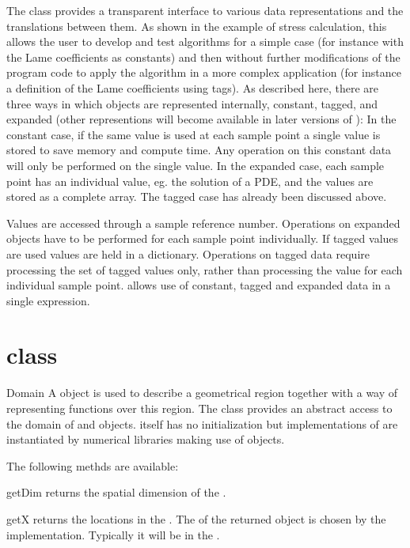 The \Data class provides a transparent interface to various data representations and the 
translations between them. As shown in the example of stress calculation, this allows the user to
develop and test algorithms for a simple case (for instance with the Lame coefficients as constants)
and then without further modifications of the program code to apply the algorithm in a
more complex application (for instance a definition of the Lame coefficients using tags). 
As described here, there are three ways in which \Data objects are represented internally, constant, tagged, and expanded (other representions will become available in later versions of \escript):
In the constant case, if the same value is used at each sample point a single value is stored to save memory and compute time. 
Any operation on this constant data will only be performed on the single value. 
In the expanded case, each sample point has an individual value, eg. the solution of a PDE,
and the values are stored as a complete array. The tagged case has already been discussed above.
 
Values are accessed through a sample reference number. Operations on expanded \Data
objects have to be performed for each sample point individually. If tagged values are used values are
held in a dictionary. Operations on tagged data require processing the set of tagged values only, rather than 
processing the value for each individual sample point. 
\escript allows use of constant, tagged and expanded data in a single expression.



\section{\Domain class}
\begin{classdesc}{Domain}{}
A \Domain object is used to describe a geometrical region together with 
a way of representing functions over this region.
The \Domain class provides an abstract access to the domain of \FunctionSpace and \Data objects. 
\Domain itself has no initialization but implementations of \Domain are 
instantiated by numerical libraries making use of \Data objects. 
\end{classdesc}
The following methds are available:
\begin{methoddesc}[Domain]{getDim}{}
returns the spatial dimension of the \Domain.
\end{methoddesc}

\begin{methoddesc}[Domain]{getX}{}
returns the locations in the \Domain. The \FunctionSpace of the returned
\Data object is chosen by the \Domain implementation. Typically it will be
in the \Function.
\end{methoddesc}

